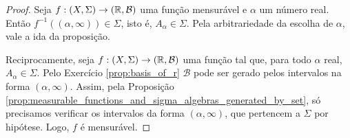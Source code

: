 \begin{proof}
    Seja $f:(X,\Sigma)\rightarrow (\mathbb{R},\mathcal{B})$ uma função mensurável e $\alpha$ um número real. Então $f^{-1}((\alpha, \infty))\in \Sigma$, isto é, $A_{\alpha}\in \Sigma$. Pela arbitrariedade da escolha de $\alpha$, vale a ida da proposição.

    Reciprocamente, seja $f:(X,\Sigma)\rightarrow (\mathbb{R},\mathcal{B})$ uma função tal que, para todo $\alpha$ real, $A_{\alpha} \in \Sigma$. Pelo Exercício \ref{prop:basis_of_r} $\mathcal{B}$ pode ser gerado pelos intervalos na forma $(\alpha,\infty)$. Assim, pela Proposição \ref{prop:measurable_functions_and_sigma_algebras_generated_by_set}, só precisamos verificar os intervalos da forma $(\alpha,\infty)$, que pertencem a $\Sigma$  por hipótese. Logo, $f$ é mensurável.
\end{proof}